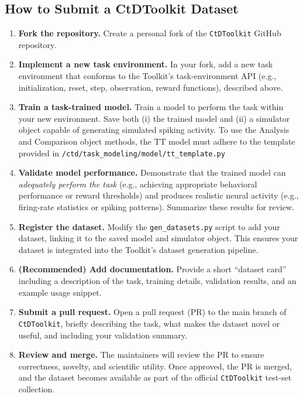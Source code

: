 \documentclass{article}
\begin{document}
\subsection{How to Submit a CtDToolkit Dataset \label{submitDataset}}
\begin{enumerate}
    \item \textbf{Fork the repository.}
    Create a personal fork of the \texttt{CtDToolkit} GitHub repository.

    \item \textbf{Implement a new task environment.}
    In your fork, add a new task environment that conforms to the Toolkit's task-environment API
    (e.g., initialization, reset, step, observation, reward functions), described above.

    \item \textbf{Train a task-trained model.}
    Train a model to perform the task within your new environment. Save both (i) the trained
    model and (ii) a simulator object capable of generating simulated spiking activity. To use the Analysis and Comparison object methods, the TT model must adhere to the template provided in \texttt{/ctd/task\_modeling/model/tt\_template.py}

    \item \textbf{Validate model performance.}
    Demonstrate that the trained model can \emph{adequately perform the task}
    (e.g., achieving appropriate behavioral performance or reward thresholds) and produces
    realistic neural activity (e.g., firing-rate statistics or spiking patterns). Summarize
    these results for review.

    \item \textbf{Register the dataset.}
    Modify the \texttt{gen\_datasets.py} script to add your dataset, linking it to the
    saved model and simulator object. This ensures your dataset is integrated into the
    Toolkit’s dataset generation pipeline.

    \item \textbf{(Recommended) Add documentation.}
    Provide a short ``dataset card'' including a description of the task, training details,
    validation results, and an example usage snippet.

    \item \textbf{Submit a pull request.}
    Open a pull request (PR) to the main branch of \texttt{CtDToolkit}, briefly describing
    the task, what makes the dataset novel or useful, and including your validation summary.

    \item \textbf{Review and merge.}
    The maintainers will review the PR to ensure correctness, novelty, and scientific utility.
    Once approved, the PR is merged, and the dataset becomes available as part of the official
    \texttt{CtDToolkit} test-set collection.
\end{enumerate}
\end{document}
